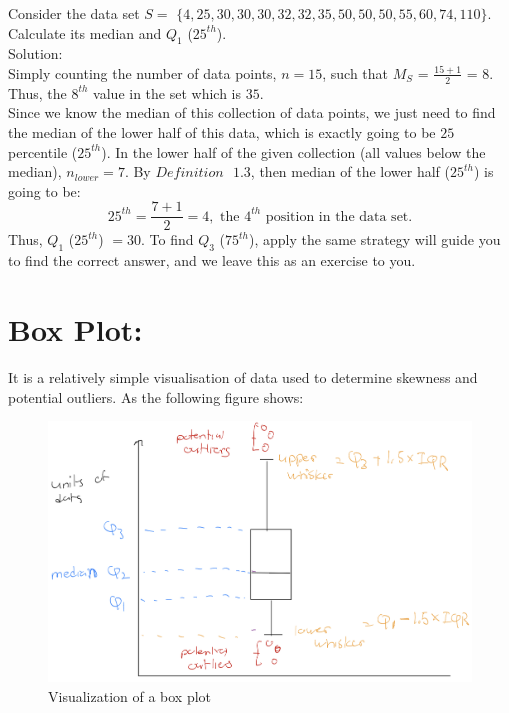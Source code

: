 \begin{example}
Consider the data set $S = $ $\{4, 25, 30, 30, 30, 32, 32, 35, 50, 50, 50, 55, 60, 74, 110\}$. Calculate its median and $Q_1$ ($25^{th}$).\\


Solution:\\

Simply counting the number of data points, $n = 15$, such that $M_{S}$ = $\frac{15 + 1}{2}$ = $8$. Thus, the $8^{th}$ value in the set which is $35$.\\

Since we know the median of this collection of data points, we just need to find the median of the lower half of this data, which is exactly going to be $25$ percentile ($25^{th}$). In the lower half of the given collection (all values below the median), $n_{lower} = 7$. By $Definition \text{ } 1.3$, then median of the lower half ($25^{th}$) is going to be: \[ 25^{th} = \frac{7+1}{2} = 4, \text{ the $4^{th}$ position in the data set}.\] Thus, $Q_1$ ($25^{th}$) $= 30$. To find $Q_3$ ($75^{th}$), apply the same strategy will guide you to find the correct answer, and we leave this as an exercise to you.

\end{example}
	
\section{Box Plot:}

It is a relatively simple visualisation of data used to determine skewness and potential outliers. As the following figure shows:
	
\begin{figure}[H]
	\centering
	\includegraphics[scale=0.25]{Section1/img/Boxplot}
	\caption{Visualization of a box plot}
\end{figure}	
	
